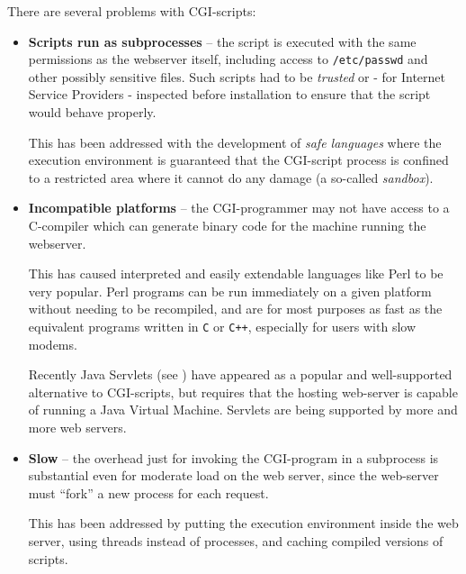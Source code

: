 
There are several problems with CGI-scripts:

\begin{itemize}
\item \textbf{Scripts run as subprocesses} -- the script is executed
  with the same permissions as the webserver itself, including access
  to \texttt{/etc/passwd} and other possibly sensitive files.  Such
  scripts had to be \textit{trusted} or - for Internet Service
  Providers - inspected before installation to ensure that the script
  would behave properly.
  
  This has been addressed with the development of \textit{safe
    languages} where the execution environment is guaranteed that the
    CGI-script process is confined to a restricted area where it
    cannot do any damage (a so-called \textit{sandbox}).

\item \textbf{Incompatible platforms} -- the CGI-programmer may not
  have access to a C-compiler which can generate binary code for the
  machine running the webserver.

  This has caused interpreted and easily extendable languages like
  Perl to be very popular.  Perl programs can be run immediately on a
  given platform without needing to be recompiled, and are for most
  purposes as fast as the equivalent programs written in \texttt{C} or
  \texttt{C++}, especially for users with slow modems.
  
  Recently Java Servlets (see ) have
  appeared as a popular and well-supported alternative to CGI-scripts,
  but requires that the hosting web-server is capable of running a
  Java Virtual Machine.  Servlets are being supported by more and more
  web servers.

\item \textbf{Slow} -- the overhead just for invoking the CGI-program
  in a subprocess is substantial even for moderate load on the web
  server, since the web-server must ``fork'' a new process for each
  request.

  This has been addressed by putting the execution environment inside
  the web server, using threads instead of processes, and caching
  compiled versions of scripts.

\end{itemize}


